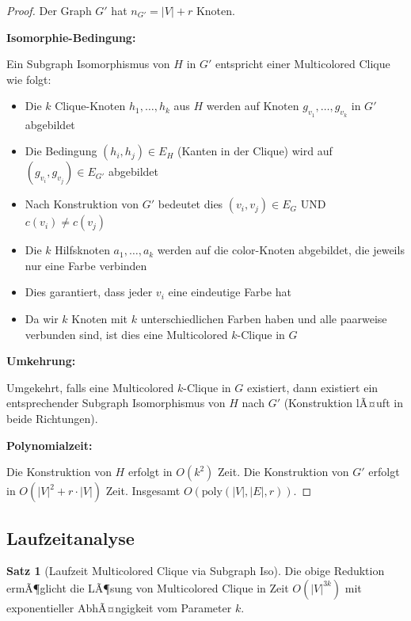 ﻿\documentclass[a4paper,12pt]{article}
\theoremstyle{definition}
\newtheorem{satz}{Satz}[section]
\begin{document}
\begin{proof}
	Der Graph $G'$ hat $n_{G'} = |V| + r$ Knoten.
	
	\textbf{Isomorphie-Bedingung:}
	
	Ein Subgraph Isomorphismus von $H$ in $G'$ entspricht einer Multicolored Clique wie folgt:
	
	\begin{itemize}
		\item Die $k$ Clique-Knoten $h_1, \ldots, h_k$ aus $H$ werden auf Knoten $g_{v_1}, \ldots, g_{v_k}$ in $G'$ abgebildet
		\item Die Bedingung $(h_i, h_j) \in E_H$ (Kanten in der Clique) wird auf $(g_{v_i}, g_{v_j}) \in E_{G'}$ abgebildet
		\item Nach Konstruktion von $G'$ bedeutet dies $(v_i, v_j) \in E_G$ UND $c(v_i) \neq c(v_j)$
		\item Die $k$ Hilfsknoten $a_1, \ldots, a_k$ werden auf die $\text{color}$-Knoten abgebildet, die jeweils nur eine Farbe verbinden
		\item Dies garantiert, dass jeder $v_i$ eine eindeutige Farbe hat
		\item Da wir $k$ Knoten mit $k$ unterschiedlichen Farben haben und alle paarweise verbunden sind, ist dies eine Multicolored $k$-Clique in $G$
	\end{itemize}
	
	\textbf{Umkehrung:}
	
	Umgekehrt, falls eine Multicolored $k$-Clique in $G$ existiert, dann existiert ein entsprechender Subgraph Isomorphismus von $H$ nach $G'$ (Konstruktion lÃ¤uft in beide Richtungen).
	
	\textbf{Polynomialzeit:}
	
	Die Konstruktion von $H$ erfolgt in $O(k^2)$ Zeit. Die Konstruktion von $G'$ erfolgt in $O(|V|^2 + r \cdot |V|)$ Zeit. Insgesamt $O(\text{poly}(|V|, |E|, r))$.
\end{proof}

\subsection{Laufzeitanalyse}

\begin{satz}[Laufzeit Multicolored Clique via Subgraph Iso]
	Die obige Reduktion ermÃ¶glicht die LÃ¶sung von Multicolored Clique in Zeit $O(|V|^{3k})$ mit exponentieller AbhÃ¤ngigkeit vom Parameter $k$.
\end{satz}
\end{document}
